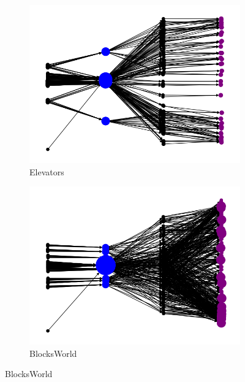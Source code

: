 \documentclass{article}
\theoremstyle{remark}
\begin{document}
\begin{figure}[t!]
\centering
\begin{subfigure}[b]{0.3\textwidth}
\centering
  \includegraphics[width=1\linewidth]{Dependencies_graphs/DepGraphElevators}
  \caption{Elevators}
  \label{fig:DepGraphElevators}
\end{subfigure}\hspace{1em}
\begin{subfigure}[b]{0.3\textwidth}
\centering
  \includegraphics[width=1\linewidth]{Dependencies_graphs/DepGraphBlocksWorld}
  \caption{BlocksWorld}
  \label{fig:DepGraphBlocksWorld}
\end{subfigure}\hspace{1em}

\end{figure}
\end{document}
